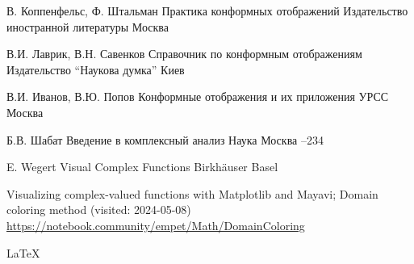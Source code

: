 \documentclass{article}
\theoremstyle{definition}
\newcommand{\q}[1]{``#1''}
\begin{document}
\begin{thebibliography}{99}
\by В. Коппенфельс, Ф. Штальман
\book Практика конформных отображений
\publ Издательство иностранной литературы
\publaddr Москва

\by В.И. Лаврик, В.Н. Савенков
\book Справочник по конформным отображениям
\publ Издательство \q{Наукова думка}
\publaddr Киев


\by В.И. Иванов, В.Ю. Попов
\book Конформные отображения и их приложения
\publ УРСС
\publaddr Москва

\by Б.В. Шабат
\inbook Введение в комплексный анализ
\publ Наука
\publaddr Москва
--234

\by E. Wegert
\book Visual Complex Functions
\publ Birkhäuser
\publaddr Basel

\eprint Visualizing complex-valued functions with Matplotlib and Mayavi; Domain coloring method
\eprintinfo (visited: 2024-05-08)
\elink \href{https://notebook.community/empet/Math/DomainColoring}{https://notebook.community/empet/Math/DomainColoring}

\end{thebibliography}
\begin{center} \Large
\LaTeX
\end{center}
\end{document}
